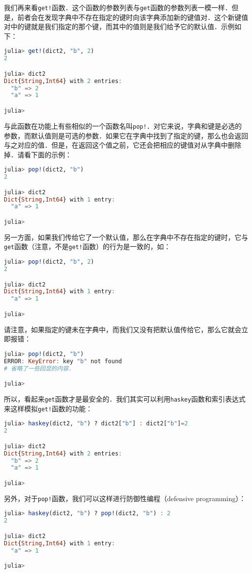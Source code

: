 我们再来看\verb|get!|函数．这个函数的参数列表与\verb|get|函数的参数列表一模一样．但是，前者会在发现字典中不存在指定的键时向该字典添加新的键值对．这个新键值对中的键就是我们指定的那个键，而其中的值则是我们给予它的默认值．示例如下：
\begin{lstlisting}[language=julia]
julia> get!(dict2, "b", 2)
2

julia> dict2
Dict{String,Int64} with 2 entries:
  "b" => 2
  "a" => 1

julia> 
\end{lstlisting}

与此函数在功能上有些相似的一个函数名叫\verb|pop!|．对它来说，字典和键是必选的参数，而默认值则是可选的参数．如果它在字典中找到了指定的键，那么也会返回与之对应的值．但是，在返回这个值之前，它还会把相应的键值对从字典中删除掉．请看下面的示例：
\begin{lstlisting}[language=julia]
julia> pop!(dict2, "b")
2

julia> dict2
Dict{String,Int64} with 1 entry:
  "a" => 1

julia> 
\end{lstlisting}

另一方面，如果我们传给它了一个默认值，那么在字典中不存在指定的键时，它与\verb|get|函数（注意，不是\verb|get!|函数）的行为是一致的，如：
\begin{lstlisting}[language=julia]
julia> pop!(dict2, "b", 2)
2

julia> dict2
Dict{String,Int64} with 1 entry:
  "a" => 1

julia> 
\end{lstlisting}

请注意，如果指定的键未在字典中，而我们又没有把默认值传给它，那么它就会立即报错：
\begin{lstlisting}[language=julia]
julia> pop!(dict2, "b")
ERROR: KeyError: key "b" not found
# 省略了一些回显的内容．

julia> 
\end{lstlisting}

所以，看起来\verb|get|函数才是最安全的．我们其实可以利用\verb|haskey|函数和索引表达式来这样模拟\verb|get!|函数的功能：
\begin{lstlisting}[language=julia]
julia> haskey(dict2, "b") ? dict2["b"] : dict2["b"]=2
2

julia> dict2
Dict{String,Int64} with 2 entries:
  "b" => 2
  "a" => 1

julia> 
\end{lstlisting}

另外，对于\verb|pop!|函数，我们可以这样进行防御性编程（defensive programming）：
\begin{lstlisting}[language=julia]
julia> haskey(dict2, "b") ? pop!(dict2, "b") : 2
2

julia> dict2
Dict{String,Int64} with 1 entry:
  "a" => 1

julia> 
\end{lstlisting}

